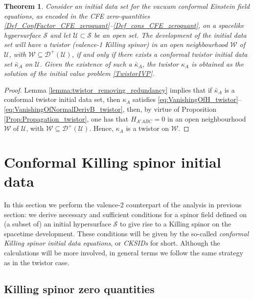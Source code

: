 \documentclass[10pt,a4paper]{article}
\theoremstyle{plain}
\newtheorem{theorem}{Theorem}
\begin{document}
\begin{theorem}\label{Theorem_twistor}
Consider an initial data set for the vacuum conformal Einstein field
equations, as encoded in the CFE zero-quantities
\eqref{Def_ConfFactor_CFE_zeroquant}--\eqref{Def_cons_CFE_zeroquant},
on a spacelike hypersurface $\mathcal{S}$ and let
$\mathcal{U}\subset\mathcal{S}$ be an open set.  The development of
the initial data set will have a twistor (valence-1 Killing spinor) in
an open neighbourhood $\mathcal{W}$ of $\mathcal{U}$, with
$\mathcal{W}\subseteq \mathcal{D}^{+}(\mathcal{U})$, if and only if
there exists a conformal twistor initial data set $\bar{\kappa}_A$ on
$\mathcal{U}$.  Given the existence of such a $\bar{\kappa}_A$, the
twistor $\kappa_A$ is obtained as the solution of the initial value
problem \eqref{TwistorIVP}.
\end{theorem}
\begin{proof}
  Lemma \ref{lemma:twistor_removing_redundancy} implies that if
  $\bar{\kappa}_A$ is a conformal twistor initial data set, then
  $\kappa_A$ satisfies
  \eqref{eq:VanishingOfH_twistor}--\eqref{eq:VanishingOfNormalDerivB_twistor},
  then, by virtue of Proposition \ref{Prop:Propagation_twistor}, one
  has that $H_{A'ABC}=0$ in an open neighbourhood $\mathcal{W}$ of
  $\mathcal{U}$, with $\mathcal{W}\subseteq
  \mathcal{D}^{+}(\mathcal{U})$. Hence, $\kappa_A$ is a
  twistor on $\mathcal{W}$.
\end{proof}

  
\section{Conformal Killing spinor initial data}
  \label{conformalKSKID}

In this section we perform the valence-2 counterpart of the analysis in previous section: we derive necessary and sufficient conditions for a spinor field defined on (a subset of) an initial hypersurface $\mathcal{S}$ to give rise to a Killing spinor on the spacetime development. These conditions will be given by the so-called \emph{conformal Killing spinor initial data
equations}, or \emph{CKSIDs} for short. Although the calculations will be more
involved, in general terms we follow the same strategy as in the twistor case.

\subsection{Killing spinor zero quantities}
\end{document}
